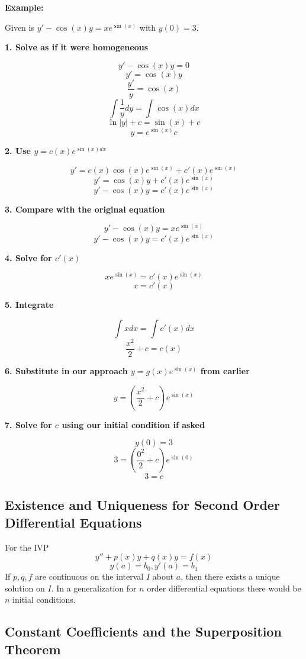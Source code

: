 \textbf{Example: }
\vspace{\baselineskip}

Given is \(y' -\cos(x)y = x e^{\sin(x)}\) with \(y(0) = 3\).
\vspace{\baselineskip}

\textbf{1. Solve as if it were homogeneous}

\[y' -\cos(x)y = 0\]
\[y' = \cos(x)y\]
\[\frac{y'}{y} = \cos(x)\]
\[\int\frac{1}{y}dy = \int \cos(x)dx \]
\[ \ln |y|  + c= \sin(x) + c \]
\[ y = e^{\sin(x)}c \]

\textbf{2. Use \(y = c(x)e^{\sin(x)dx}\)}

\[y' = c(x)\cos(x)e^{\sin(x)} + c'(x)e^{\sin(x)}\]
\[y' = \cos(x)y + c'(x)e^{\sin(x)}\]
\[y' - \cos(x)y = c'(x)e^{\sin(x)}\]

\textbf{3. Compare with the original equation}

\[y' -\cos(x)y = x e^{\sin(x)}\]
\[y' - \cos(x)y = c'(x)e^{\sin(x)}\]

\textbf{4. Solve for \(c'(x)\)}

\[xe^{\sin(x)} = c'(x)e^{\sin(x)}\]
\[x = c'(x)\]

\textbf{5. Integrate}

\[\int x dx= \int c'(x)dx\]
\[\frac{x^2}{2} + c = c(x)\]

\textbf{6. Substitute in our approach \(y = g(x)e^{\sin(x)}\) from earlier}

\[y = \left(\frac{x^2}{2} + c\right)e^{\sin(x)}\]

\textbf{7. Solve for \(c\) using our initial condition if asked}

\[y(0) = 3\]
\[3 = \left(\frac{0^2}{2} + c\right)e^{\sin(0)}\]
\[3 = c\]


\subsection{Existence and Uniqueness for Second Order Differential Equations}

For the IVP
\[y'' + p(x)y + q(x)y = f(x)\]
\[y(a) = b_0, y'(a) = b_1\]
If \(p,q,f\) are continuous on the interval \(I\) about \(a\), then there exists a unique
solution on \(I\). In a generalization for \(n\) order differential equations there would be \(n\) 
initial conditions. 

\subsection{Constant Coefficients and the Superposition Theorem}

